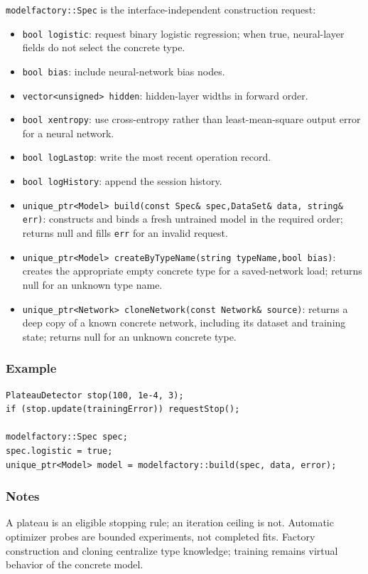 \texttt{modelfactory::Spec} is the interface-independent construction request:

\begin{itemize}
\item \texttt{bool logistic}: request binary logistic regression; when true,
      neural-layer fields do not select the concrete type.
\item \texttt{bool bias}: include neural-network bias nodes.
\item \texttt{vector<unsigned> hidden}: hidden-layer widths in forward order.
\item \texttt{bool xentropy}: use cross-entropy rather than least-mean-square
      output error for a neural network.
\item \texttt{bool logLastop}: write the most recent operation record.
\item \texttt{bool logHistory}: append the session history.
\end{itemize}

\begin{itemize}
\item \texttt{unique\_ptr<Model> build(const Spec\& spec,DataSet\& data,
      string\& err)}: constructs and binds a fresh untrained model in the
      required order; returns null and fills \texttt{err} for an invalid request.
\item \texttt{unique\_ptr<Model> createByTypeName(string typeName,bool bias)}:
      creates the appropriate empty concrete type for a saved-network load;
      returns null for an unknown type name.
\item \texttt{unique\_ptr<Network> cloneNetwork(const Network\& source)}:
      returns a deep copy of a known concrete network, including its dataset and
      training state; returns null for an unknown concrete type.
\end{itemize}

\subsubsection{Example}
\begin{verbatim}
PlateauDetector stop(100, 1e-4, 3);
if (stop.update(trainingError)) requestStop();

modelfactory::Spec spec;
spec.logistic = true;
unique_ptr<Model> model = modelfactory::build(spec, data, error);
\end{verbatim}

\subsubsection{Notes}
A plateau is an eligible stopping rule; an iteration ceiling is not.  Automatic
optimizer probes are bounded experiments, not completed fits.  Factory
construction and cloning centralize type knowledge; training remains virtual
behavior of the concrete model.

